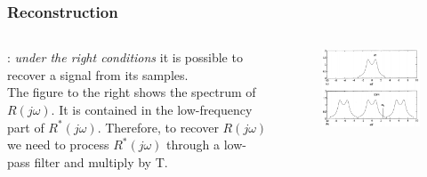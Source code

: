 \begin{frame}
	\frametitle{Reconstruction}
	\begin{columns}
		\begin{column}{0.4\textwidth}
		\underline{}: \textit{under the right conditions} it is possible to recover a signal from its samples.\\
		\vspace{1em}
		The figure to the right shows the spectrum of $R(j\omega)$. It is contained in the low-frequency part of $R^*(j\omega)$. Therefore, to recover $R(j\omega)$ we need to process $R^*(j\omega)$ through a low-pass filter and multiply by T.\\
		\end{column}
		\begin{column}{0.6\textwidth}
		\vspace{-4ex}
		\begin{figure}
			\centering
			\includegraphics[width=1\linewidth]{reconstruction}
		\end{figure}
		\end{column}
	\end{columns}
\end{frame}

